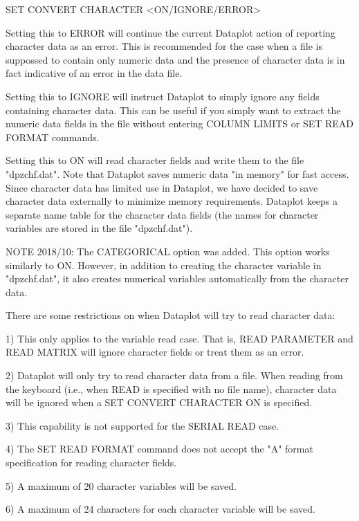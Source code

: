      SET CONVERT CHARACTER <ON/IGNORE/ERROR>

Setting this to ERROR will continue the current Dataplot action of
reporting character data as an error.  This is recommended for the
case when a file is suppossed to contain only numeric data and the
presence of character data is in fact indicative of an error in the
data file.

Setting this to IGNORE will instruct Dataplot to simply ignore any
fields containing character data.  This can be useful if you simply
want to extract the numeric data fields in the file without
entering COLUMN LIMITS or SET READ FORMAT commands.

Setting this to ON will read character fields and write them to the
file "dpzchf.dat".  Note that Dataplot saves numeric data
"in memory" for fast access.  Since character data has limited
use in Dataplot, we have decided to save character data 
externally to minimize memory requirements.  Dataplot keeps a
separate name table for the character data fields (the names for
character variables are stored in the file "dpzchf.dat").

NOTE 2018/10: The CATEGORICAL option was added.  This option works
              similarly to ON.  However, in addition to creating the
              character variable in "dpzchf.dat", it also creates
              numerical variables automatically from the character
              data.

There are some restrictions on when Dataplot will try to
read character data:

   1) This only applies to the variable read case.  That
      is, READ PARAMETER and READ MATRIX will ignore
      character fields or treat them as an error.

   2) Dataplot will only try to read character data from
      a file.  When reading from the keyboard (i.e., when
      READ is specified with no file name), character data
      will be ignored when a SET CONVERT CHARACTER ON is
      specified.

   3) This capability is not supported for the SERIAL READ
      case.

   4) The SET READ FORMAT command does not accept the
      "A" format specification for reading character
      fields.

   5) A maximum of 20 character variables will be saved.

   6) A maximum of 24 characters for each character variable
      will be saved.

